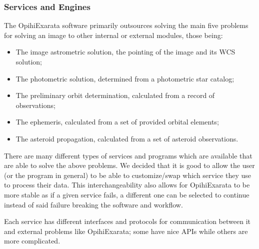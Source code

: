 \documentclass[letterpaper,11pt,english]{sphinxmanual}
\begin{document}
\sphinxstepscope


\subsubsection{Services and Engines}
\label{\detokenize{technical/architecture/services_engines:services-and-engines}}\label{\detokenize{technical/architecture/services_engines:technical-architecture-services-engines}}\label{\detokenize{technical/architecture/services_engines::doc}}
\sphinxAtStartPar
The OpihiExarata software primarily outsources solving the main five problems
for solving an image to other internal or external modules, those being:
\begin{itemize}
\item {} 
\sphinxAtStartPar
The image astrometric solution, the pointing of the image and its WCS solution;

\item {} 
\sphinxAtStartPar
The photometric solution, determined from a photometric star catalog;

\item {} 
\sphinxAtStartPar
The preliminary orbit determination, calculated from a record of observations;

\item {} 
\sphinxAtStartPar
The ephemeris, calculated from a set of provided orbital elements;

\item {} 
\sphinxAtStartPar
The asteroid propagation, calculated from a set of asteroid observations.

\end{itemize}

\sphinxAtStartPar
There are many different types of services and programs which are available
that are able to solve the above problems. We decided that it is good to
allow the user (or the program in general) to be able to customize/swap which
service they use to process their data. This interchangeability also allows
for OpihiExarata to be more stable as if a given service fails, a different
one can be selected to continue instead of said failure breaking the
software and workflow.

\sphinxAtStartPar
Each service has different interfaces and protocols for communication between
it and external problems like OpihiExarata; some have nice APIs while others
are more complicated.
\end{document}
